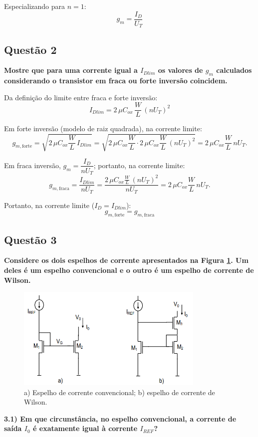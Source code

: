 ﻿\documentclass[12pt,a4paper]{article}
\begin{document}
Especializando para $n = 1$:
\begin{equation}
\boxed{g_m = \frac{I_D}{U_T}}
\end{equation}

\subsection*{Questão 2}
\textbf{Mostre que para uma corrente igual a $I_{Dlim}$ os valores de $g_m$ calculados considerando o transistor em fraca ou forte inversão coincidem.}

Da definição do limite entre fraca e forte inversão:
\begin{equation}
I_{Dlim} = 2\,\mu C_{ox}\,\frac{W}{L}\,(nU_T)^2
\end{equation}

Em forte inversão (modelo de raiz quadrada), na corrente limite:
\begin{equation*}
g_{m,\text{forte}}=\sqrt{2\,\mu C_{ox}\frac{W}{L}\,I_{Dlim}}
=\sqrt{2\,\mu C_{ox}\frac{W}{L}\cdot 2\,\mu C_{ox}\frac{W}{L}\,(nU_T)^2}
=2\,\mu C_{ox}\frac{W}{L}\,nU_T.
\end{equation*}

Em fraca inversão, $g_m=\dfrac{I_D}{nU_T}$; portanto, na corrente limite:
\begin{equation*}
g_{m,\text{fraca}}=\frac{I_{Dlim}}{nU_T}
=\frac{2\,\mu C_{ox}\frac{W}{L}\,(nU_T)^2}{nU_T}
=2\,\mu C_{ox}\frac{W}{L}\,nU_T.
\end{equation*}

Portanto, na corrente limite ($I_D=I_{Dlim}$):
\begin{equation}
\boxed{g_{m,\text{forte}} = g_{m,\text{fraca}}}
\end{equation}

\subsection*{Questão 3}
	\textbf{Considere os dois espelhos de corrente apresentados na Figura \ref{fig:espelhos_corrente}. Um deles é um espelho convencional e o outro é um espelho de corrente de Wilson.}

\begin{figure}[H]
    \centering
    \includegraphics[width=0.8\textwidth]{espelho_a_b.png}
    \caption{a) Espelho de corrente convencional; b) espelho de corrente de Wilson.}
    \label{fig:espelhos_corrente}
\end{figure}
\textbf{3.1) Em que circunstância, no espelho convencional, a corrente de saída $I_0$ é exatamente igual à corrente $I_{REF}$?}
\end{document}
